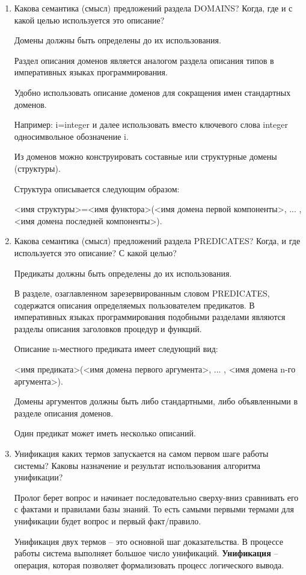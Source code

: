 \documentclass[a4paper,14pt]{extreport} %
\begin{document}
\begin{enumerate}
\item Какова семантика (смысл) предложений раздела DOMAINS?  Когда, где и с какой целью используется это описание?

Домены должны быть определены до их использования. 

Раздел описания доменов является аналогом раздела описания типов в императивных языках программирования. 

Удобно использовать описание доменов для сокращения имен стандартных доменов. 

Например: i=integer
и далее использовать вместо ключевого слова integer односимвольное обозначение i.

Из доменов можно конструировать составные или структурные домены (структуры). 

Структура описывается следующим образом:

<имя структуры>=<имя функтора>(<имя домена первой компоненты>, ... , <имя домена последней компоненты>). 

\item Какова семантика (смысл) предложений раздела PREDICATES? Когда, и где используется это описание? С какой целью?

Предикаты должны быть определены до их использования. 

В разделе, озаглавленном зарезервированным словом PREDICATES, содержатся описания определяемых пользователем предикатов. В императивных языках программирования подобными разделами являются разделы описания заголовков процедур и функций. 

Описание n-местного предиката имеет следующий вид:

<имя предиката>(<имя домена первого аргумента>, ... , <имя домена n-го аргумента>).

Домены аргументов должны быть либо стандартными, либо объявленными в разделе описания доменов. 

Один предикат может иметь несколько описаний. 

\item Унификация каких термов запускается на самом первом шаге работы системы? Каковы назначение и результат использования алгоритма унификации? 

Пролог берет вопрос и начинает последовательно сверху-вниз сравнивать его с фактами и правилами базы знаний. То есть самыми первыми термами для унификации будет вопрос и первый факт/правило. 

Унификация двух термов -- это основной шаг доказательства. В процессе работы система выполняет большое число унификаций.
\textbf{Унификация} -- операция, которая позволяет формализовать процесс логического вывода. 


\end{enumerate}
\end{document}
